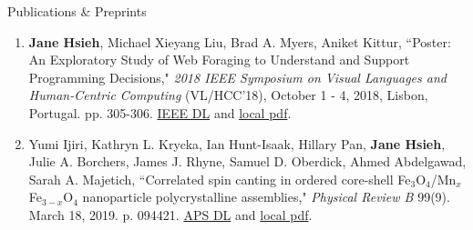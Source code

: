 \documentclass{resume}
\begin{document}
\begin{rSection}{Publications \& Preprints}
\begin{enumerate}
    \item \textbf{Jane Hsieh}, Michael Xieyang Liu, Brad A. Myers, Aniket Kittur, ``Poster: An Exploratory Study of Web Foraging to Understand and Support Programming Decisions," \textit{2018 IEEE Symposium on Visual Languages and Human-Centric Computing} (VL/HCC'18), October 1 - 4, 2018, Lisbon, Portugal. pp. 305-306. \href{https://ieeexplore.ieee.org/document/8506517}{IEEE DL} and \href{http://www.cs.cmu.edu/~NatProg/papers/p305-hsieh.pdf}{local pdf}.
    \item Yumi Ijiri, Kathryn L. Krycka, Ian Hunt-Isaak, Hillary Pan, \textbf{Jane Hsieh}, Julie A. Borchers, James J. Rhyne, Samuel D. Oberdick, Ahmed Abdelgawad, Sarah A. Majetich, ``Correlated spin canting in ordered core-shell Fe$_3$O$_4$/Mn$_x$Fe$_{3-x}$O$_4$ nanoparticle polycrystalline assemblies," \textit{Physical Review B} 99(9). March 18, 2019. p. 094421. \href{https://journals.aps.org/prb/abstract/10.1103/PhysRevB.99.094421}{APS DL} and \href{https://janeon.github.io/assets/img/PhysRevB.99.094421.pdf}{local pdf}.

\end{enumerate}
\end{rSection}
\end{document}
